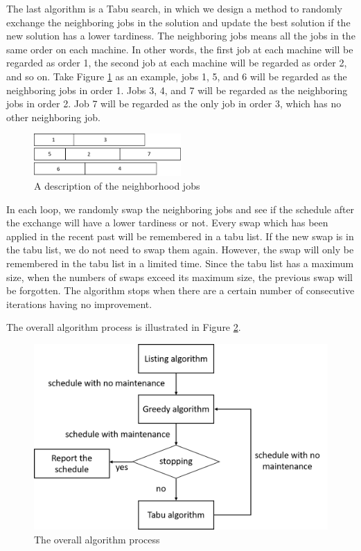 \documentclass[12pt,a4page]{article}
\theoremstyle{definition}
\theoremstyle{remark}
\begin{document}
The last algorithm is a Tabu search, in which we design a method to randomly exchange the neighboring jobs in the solution and update the best solution if the new solution has a lower tardiness. The neighboring jobs means all the jobs in the same order on each machine. In other words, the first job at each machine will be regarded as order 1, the second job at each machine will be regarded as order 2, and so on. Take Figure \ref{fig:neighborhood} as an example, jobs 1, 5, and 6 will be regarded as the neighboring jobs in order 1. Jobs 3, 4, and 7 will be regarded as the neighboring jobs in order 2. Job 7 will be regarded as the only job in order 3, which has no other neighboring job.
\begin{figure}
		\centering
		\includegraphics[width=0.5\textwidth]{figure/neighborhood.png}
		\caption{A description of the neighborhood jobs}
		\label{fig:neighborhood}
\end{figure}

In each loop, we randomly swap the neighboring jobs and see if the schedule after the exchange will have a lower tardiness or not. Every swap which has been applied in the recent past will be remembered in a tabu list. If the new swap is in the tabu list, we do not need to swap them again. However, the swap will only be remembered in the tabu list in a limited time. Since the tabu list has a maximum size, when the numbers of swaps exceed its maximum size, the previous swap will be forgotten. The algorithm stops when there are a certain number of consecutive iterations having no improvement.

The overall algorithm process is illustrated in Figure \ref{fig:alg_flow}.
\begin{figure}
		\centering
		\includegraphics[height=0.4\textwidth]{figure/alg_flow.png}
		\caption{The overall algorithm process}
		\label{fig:alg_flow}
\end{figure}
\end{document}
